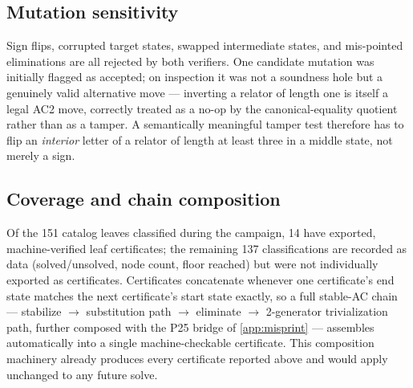 \begin{table}[tbp]
\centering
\caption{The five exported acx-cert-v1 chain certificates, each passing both the engine
author's verifier and the independently authored black-box verifier.}
\label{tab:certs}
\small
\setlength{\tabcolsep}{3pt}%

\end{table}

\subsection{Mutation sensitivity}

Sign flips, corrupted target states, swapped intermediate states, and mis-pointed
eliminations are all rejected by both verifiers. One candidate mutation was initially
flagged as accepted; on inspection it was not a soundness hole but a genuinely valid
alternative move --- inverting a relator of length one is itself a legal AC2 move, correctly
treated as a no-op by the canonical-equality quotient rather than as a tamper. A
semantically meaningful tamper test therefore has to flip an \emph{interior} letter of a
relator of length at least three in a middle state, not merely a sign.

\subsection{Coverage and chain composition}

Of the 151 catalog leaves classified during the campaign, 14 have exported,
machine-verified leaf certificates; the remaining 137 classifications are recorded as data
(solved/unsolved, node count, floor reached) but were not individually exported as
certificates. Certificates concatenate whenever one certificate's end state matches the
next certificate's start state exactly, so a full stable-AC chain --- stabilize $\to$
substitution path $\to$ eliminate $\to$ 2-generator trivialization path, further composed
with the P25 bridge of \ref{app:misprint} --- assembles automatically into a single
machine-checkable certificate. This composition machinery already produces every
certificate reported above and would apply unchanged to any future solve.
